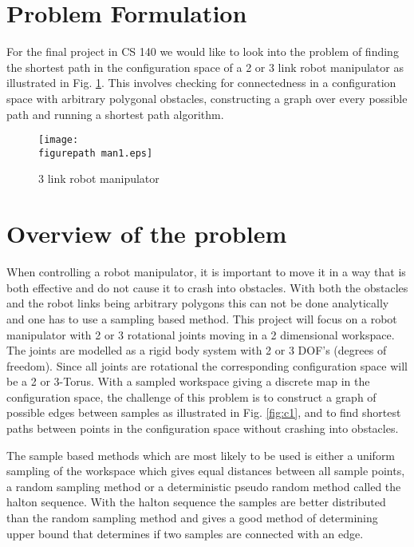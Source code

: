 \newcommand{\figurepath}{./figures/}
\newcommand{\figurescale}{0.6}
\newcommand{\codepath}{../matlab/}
\setlength\parindent{24pt}

\section*{Problem Formulation}
For the final project in CS 140 we would like to look into the problem of finding the shortest path in the configuration space of a 2 or 3 link robot manipulator as illustrated in Fig. \ref{fig:man1}. This involves checking for connectedness in a configuration space with arbitrary polygonal obstacles, constructing a graph over every possible path and running a shortest path algorithm. 


\begin{figure}[h!] 
 \center 
 \texttt{[image: \\figurepath man1.eps]}
 \caption{ 3 link robot manipulator \label{fig:man1}}
 \end{figure}

\section*{Overview of the problem}
When controlling a robot manipulator, it is important to move it in a way that is both effective and do not cause it to crash into obstacles. With both the obstacles and the robot links being arbitrary polygons this can not be done analytically and one has to use a sampling based method. This project will focus on a robot manipulator with 2 or 3 rotational joints moving in a 2 dimensional workspace. The joints are modelled as a rigid body system with 2 or 3 DOF's (degrees of freedom). Since all joints are rotational the corresponding configuration space will be a 2 or 3-Torus. With a sampled workspace giving a discrete map in the configuration space, the challenge of this problem is to construct a graph of possible edges between samples as illustrated in Fig. \ref{fig:c1}, and to find shortest paths between points in the configuration space without crashing into obstacles.  
\\
\par 

The sample based methods which are most likely to be used is either a uniform sampling of the workspace which gives equal distances between all sample points, a random sampling method or a deterministic pseudo random method called the halton sequence. With the halton sequence the samples are better distributed than the random sampling method and gives a good method of determining upper bound that determines if two samples are connected with an edge.





